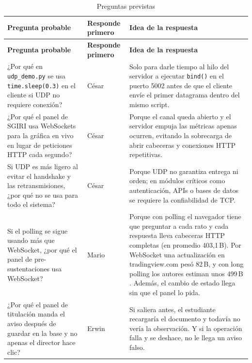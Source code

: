 {\small\renewcommand{\arraystretch}{1.2}
\begin{xltabular}{\textwidth}{@{}>{\raggedright\arraybackslash}p{6.0cm}>{\raggedright\arraybackslash}p{2.4cm}X@{}}
  \caption{Preguntas previstas}\label{tab:preguntas}\\
  \toprule
  \textbf{Pregunta probable} & \textbf{Responde primero} & \textbf{Idea de la respuesta}\\
  \midrule
  \endfirsthead
  \toprule
  \textbf{Pregunta probable} & \textbf{Responde primero} & \textbf{Idea de la respuesta}\\
  \midrule
  \endhead
  \bottomrule
  \endlastfoot
  ¿Por qué en \texttt{udp\_demo.py} se usa \texttt{time.sleep(0.3)} en el cliente si UDP no requiere conexión? & César & Solo para darle tiempo al hilo del servidor a ejecutar \texttt{bind()} en el puerto 5002 antes de que el cliente envíe el primer datagrama dentro del mismo script.\\
  ¿Por qué el panel de SGIRI usa WebSockets para la gráfica en vivo en lugar de peticiones HTTP cada segundo? & César & Porque el canal queda abierto y el servidor empuja las métricas apenas ocurren, evitando la sobrecarga de abrir cabeceras y conexiones HTTP repetitivas.\\
  Si UDP es más ligero al evitar el handshake y las retransmisiones, ¿por qué no se usa para todo el sistema? & César & Porque UDP no garantiza entrega ni orden; en módulos críticos como autenticación, APIs o bases de datos se requiere la confiabilidad de TCP.\\
  Si el polling se sigue usando más que WebSocket, ¿por qué el panel de pre-sustentaciones usa WebSocket? & Mario & Porque con polling el navegador tiene que preguntar a cada rato y cada respuesta lleva cabeceras HTTP completas (en promedio 403,1\,B). Por WebSocket una actualización en tradingview.com pesó 82\,B, y con long polling los autores estiman unos 499\,B \cite[p.~1197]{Murley2021}. Además, el cambio de estado llega sin que el panel lo pida.\\
  ¿Por qué el panel de titulación manda el aviso después de guardar en la base y no apenas el director hace clic? & Erwin & Si saliera antes, el estudiante recargaría el documento y todavía no vería la observación. Y si la operación falla y se deshace, no le llega un aviso falso.\\
\end{xltabular}}

